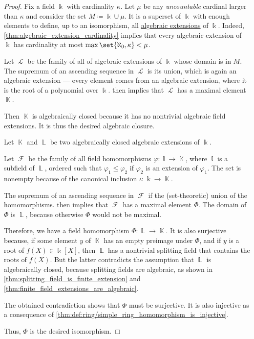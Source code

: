 \begin{proof}
  \ExistenceSubProof{} Fix a field \( \Bbbk \) with cardinality \( \kappa \). Let \( \mu \) be any \emph{uncountable} cardinal larger than \( \kappa \) and consider the set \( M \coloneqq \Bbbk \cup \mu \). It is a superset of \( \Bbbk \) with enough elements to define, up to an isomorphism, all \hyperref[def:algebraic_extension]{algebraic extensions} of \( \Bbbk \). Indeed, \cref{thm:algebraic_extension_cardinality} implies that every algebraic extension of \( \Bbbk \) has cardinality at most \( \max\set{ \aleph_0, \kappa } < \mu \).

  Let \( \mscrL \) be the family of all of algebraic extensions of \( \Bbbk \) whose domain is in \( M \). The supremum of an ascending sequence in \( \mscrL \) is its union, which is again an algebraic extension --- every element comes from an algebraic extension, where it is the root of a polynomial over \( \Bbbk \).  then implies that \( \mscrL \) has a maximal element \( \BbbK \).

  Then \( \BbbK \) is algebraically closed because it has no nontrivial algebraic field extensions. It is thus the desired algebraic closure.

  \UniquenessSubProof Let \( \BbbK \) and \( \BbbL \) be two algebraically closed algebraic extensions of \( \Bbbk \).

  Let \( \mscrF \) be the family of all field homomorphisms \( \varphi: \Bbbl \to \BbbK \), where \( \Bbbl \) is a subfield of \( \BbbL \), ordered such that \( \varphi_1 \leq \varphi_2 \) if \( \varphi_2 \) is an extension of \( \varphi_1 \). The set is nonempty because of the canonical inclusion \( \iota: \Bbbk \to \BbbK \).

  The supremum of an ascending sequence in \( \mscrF \) if the (set-theoretic) union of the homomorphisms.  then implies that \( \mscrF \) has a maximal element \( \Phi \). The domain of \( \Phi \) is \( \BbbL \), because otherwise \( \Phi \) would not be maximal.

  Therefore, we have a field homomorphism \( \Phi: \BbbL \to \BbbK \). It is also surjective because, if some element \( y \) of \( \BbbK \) has an empty preimage under \( \Phi \), and if \( y \) is a root of \( f(X) \in \Bbbk[X] \), then \( \BbbL \) has a nontrivial splitting field that contains the roots of \( f(X) \). But the latter contradicts the assumption that \( \BbbL \) is algebraically closed, because splitting fields are algebraic, as shown in \cref{thm:splitting_field_is_finite_extension} and \cref{thm:finite_field_extensions_are_algebraic}.

  The obtained contradiction shows that \( \Phi \) must be surjective. It is also injective as a consequence of \cref{thm:def:ring/simple_ring_homomorphism_is_injective}.

  Thus, \( \Phi \) is the desired isomorphism.
\end{proof}

